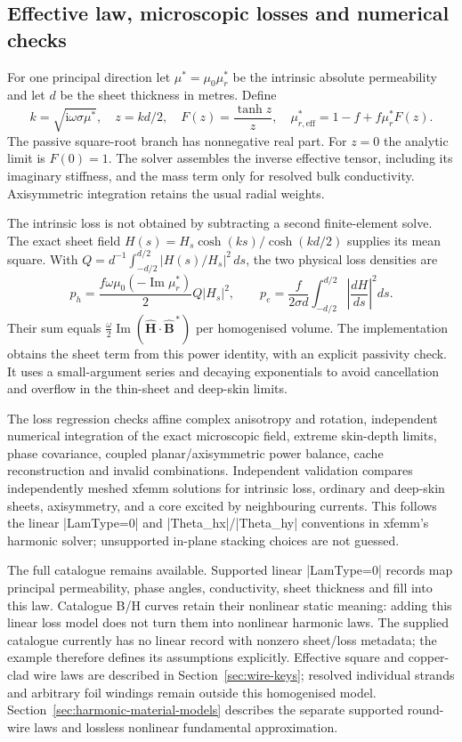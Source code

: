\subsection{Effective law, microscopic losses and numerical checks}
For one principal direction let $\mu^*=\mu_0\mu_r^*$ be the intrinsic absolute
permeability and let $d$ be the sheet thickness in metres. Define
\[
 k=\sqrt{\mathrm i\omega\sigma\mu^*},\quad
 z=kd/2,\quad F(z)=\frac{\tanh z}{z},\quad
 \mu_{r,\mathrm{eff}}^*=1-f+f\mu_r^*F(z).
\]
The passive square-root branch has nonnegative real part. For $z=0$ the
analytic limit is $F(0)=1$. The solver assembles the inverse effective tensor,
including its imaginary stiffness, and the mass term only for resolved bulk
conductivity. Axisymmetric integration retains the usual radial weights.

The intrinsic loss is not obtained by subtracting a second finite-element
solve. The exact sheet field
$H(s)=H_s\cosh(ks)/\cosh(kd/2)$ supplies its mean square. With
$Q=d^{-1}\int_{-d/2}^{d/2}|H(s)/H_s|^2\,ds$, the two physical loss densities are
\[
 p_h=\frac{f\omega\mu_0(-\operatorname{Im}\mu_r^*)}{2}Q|H_s|^2,
 \qquad
 p_e=\frac{f}{2\sigma d}\int_{-d/2}^{d/2}
                    \left|\frac{dH}{ds}\right|^2ds.
\]
Their sum equals
$\tfrac\omega2\operatorname{Im}(\widehat{\mathbf H}\cdot
\widehat{\mathbf B}^{\,*})$ per homogenised volume. The implementation obtains
the sheet term from this power identity, with an explicit passivity check.
It uses a small-argument series and decaying exponentials to avoid cancellation
and overflow in the thin-sheet and deep-skin limits.

The loss regression checks affine complex anisotropy and rotation,
independent numerical integration of the exact microscopic field, extreme
skin-depth limits, phase covariance, coupled planar/axisymmetric power balance,
cache reconstruction and invalid combinations. Independent validation compares independently meshed xfemm solutions
for intrinsic loss, ordinary and deep-skin sheets, axisymmetry, and a core
excited by neighbouring currents. This follows the linear |LamType=0| and
|Theta_hx|/|Theta_hy| conventions in xfemm's harmonic solver; unsupported
in-plane stacking choices are not guessed.

The full catalogue remains available. Supported linear |LamType=0| records
map principal permeability, phase angles, conductivity, sheet thickness and
fill into this law. Catalogue B/H curves retain their nonlinear static meaning:
adding this linear loss model does not turn them into nonlinear harmonic laws.
The supplied catalogue currently has no linear record with nonzero sheet/loss
metadata; the example therefore defines its assumptions explicitly. Effective square and copper-clad wire laws are described in
Section~\ref{sec:wire-keys}; resolved individual strands and arbitrary foil
windings remain outside this homogenised model.
Section~\ref{sec:harmonic-material-models} describes the separate supported
round-wire laws and lossless nonlinear fundamental approximation.

